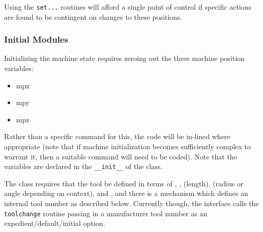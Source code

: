 \documentclass{ltxdoc}
\begin{document}
\noindent Using the \verb|set...| routines will afford a single point of control if specific actions are found to be contingent on changes to these positions.


\subsubsection{Initial Modules}

Initializing the machine state requires zeroing out the three machine position variables:

\begin{itemize}
\item mpx
\item mpy
\item mpz
\end{itemize}

\noindent Rather than a specific command for this, the code will be in-lined where appropriate (note that if machine initialization becomes sufficiently complex to warrant it, then a suitable command will need to be coded). Note that the variables are declared in the \verb|__init__| of the class.

The  class requires that the tool be defined in terms of , ,  (length),  (radius or angle depending on context), and , and there is a mechanism which defines an internal tool number as described below. Currently though, the interface calls the \verb|toolchange| routine passing in a manufacturer tool number as an expedient/default/initial option.
\end{document}

